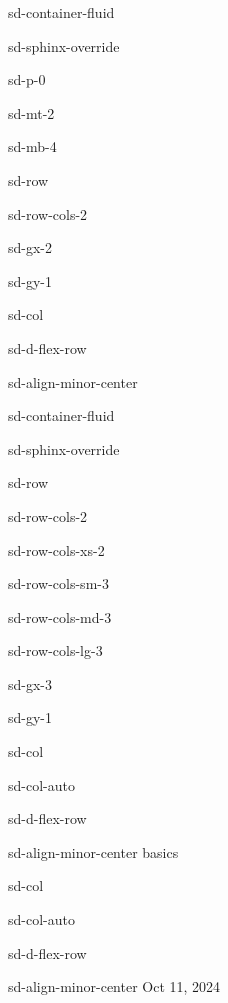 \documentclass[letterpaper,10pt,english]{jupyterBook}
\begin{document}
\begin{sphinxuseclass}{sd-container-fluid}
\begin{sphinxuseclass}{sd-sphinx-override}
\begin{sphinxuseclass}{sd-p-0}
\begin{sphinxuseclass}{sd-mt-2}
\begin{sphinxuseclass}{sd-mb-4}
\begin{sphinxuseclass}{sd-row}
\begin{sphinxuseclass}{sd-row-cols-2}
\begin{sphinxuseclass}{sd-gx-2}
\begin{sphinxuseclass}{sd-gy-1}
\begin{sphinxuseclass}{sd-col}
\begin{sphinxuseclass}{sd-d-flex-row}
\begin{sphinxuseclass}{sd-align-minor-center}
\begin{sphinxuseclass}{sd-container-fluid}
\begin{sphinxuseclass}{sd-sphinx-override}
\begin{sphinxuseclass}{sd-row}
\begin{sphinxuseclass}{sd-row-cols-2}
\begin{sphinxuseclass}{sd-row-cols-xs-2}
\begin{sphinxuseclass}{sd-row-cols-sm-3}
\begin{sphinxuseclass}{sd-row-cols-md-3}
\begin{sphinxuseclass}{sd-row-cols-lg-3}
\begin{sphinxuseclass}{sd-gx-3}
\begin{sphinxuseclass}{sd-gy-1}
\begin{sphinxuseclass}{sd-col}
\begin{sphinxuseclass}{sd-col-auto}
\begin{sphinxuseclass}{sd-d-flex-row}
\begin{sphinxuseclass}{sd-align-minor-center}
\sphinxAtStartPar
basics

\end{sphinxuseclass}
\end{sphinxuseclass}
\end{sphinxuseclass}
\end{sphinxuseclass}
\begin{sphinxuseclass}{sd-col}
\begin{sphinxuseclass}{sd-col-auto}
\begin{sphinxuseclass}{sd-d-flex-row}
\begin{sphinxuseclass}{sd-align-minor-center}
\sphinxAtStartPar
Oct 11, 2024


\end{sphinxuseclass}
\end{sphinxuseclass}
\end{sphinxuseclass}
\end{sphinxuseclass}
\end{sphinxuseclass}
\end{sphinxuseclass}
\end{sphinxuseclass}
\end{sphinxuseclass}
\end{sphinxuseclass}
\end{sphinxuseclass}
\end{sphinxuseclass}
\end{sphinxuseclass}
\end{sphinxuseclass}
\end{sphinxuseclass}
\end{sphinxuseclass}
\end{sphinxuseclass}
\end{sphinxuseclass}
\end{sphinxuseclass}
\end{sphinxuseclass}
\end{sphinxuseclass}
\end{sphinxuseclass}
\end{sphinxuseclass}
\end{sphinxuseclass}
\end{sphinxuseclass}
\end{sphinxuseclass}
\end{sphinxuseclass}
\end{document}
